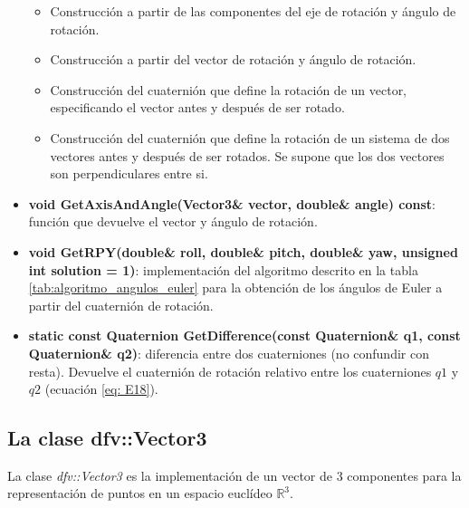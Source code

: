 \documentclass[12pt, a4paper]{report}
\begin{document}
\begin{itemize}
	\begin{itemize}
	\item Construcción a partir de las componentes del eje de rotación y ángulo de rotación.
	\item Construcción a partir del vector de rotación y ángulo de rotación.
	\item Construcción del cuaternión que define la rotación de un vector, especificando el vector antes y después de ser rotado.
	\item Construcción del cuaternión que define la rotación de un sistema de dos vectores antes y después de ser rotados. Se supone que los dos vectores son perpendiculares entre si.
	\end{itemize}

\item \textbf{void GetAxisAndAngle(Vector3\& vector, double\& angle) const}: función que devuelve el vector y ángulo de rotación.
\item \textbf{void GetRPY(double\& roll, double\& pitch, double\& yaw, unsigned int solution = 1)}: implementación del algoritmo descrito en la tabla \ref{tab:algoritmo_angulos_euler} para la obtención de los ángulos de Euler a partir del cuaternión de rotación.
\item \textbf{static const Quaternion GetDifference(const Quaternion\& q1, const Quaternion\& q2)}: diferencia entre dos cuaterniones (no confundir con resta). Devuelve el cuaternión de rotación relativo entre los cuaterniones $q1$ y $q2$ (ecuación \eqref{eq: E18}).  

\end{itemize}

\subsection{La clase dfv::Vector3}

La clase \textit{dfv::Vector3} es la implementación de un vector de 3 componentes para la representación de puntos en un espacio euclídeo $\mathbb{R}^3$. 
\end{document}
